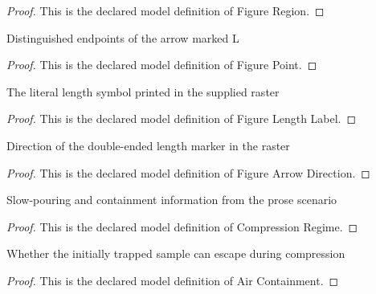 \begin{proof}
  This is the declared model definition of Figure Region.
\end{proof}
\begin{definition}
  \label{def:physics:phyx-mini-0366:phyxminiproblems-problemphyxmini0366-figurepoint}
  Distinguished endpoints of the arrow marked L
\end{definition}
\begin{proof}
  This is the declared model definition of Figure Point.
\end{proof}
\begin{definition}
  \label{def:physics:phyx-mini-0366:phyxminiproblems-problemphyxmini0366-figurelengthlabel}
  The literal length symbol printed in the supplied raster
\end{definition}
\begin{proof}
  This is the declared model definition of Figure Length Label.
\end{proof}
\begin{definition}
  \label{def:physics:phyx-mini-0366:phyxminiproblems-problemphyxmini0366-figurearrowdirection}
  Direction of the double-ended length marker in the raster
\end{definition}
\begin{proof}
  This is the declared model definition of Figure Arrow Direction.
\end{proof}
\begin{definition}
  \label{def:physics:phyx-mini-0366:phyxminiproblems-problemphyxmini0366-compressionregime}
  Slow-pouring and containment information from the prose scenario
\end{definition}
\begin{proof}
  This is the declared model definition of Compression Regime.
\end{proof}
\begin{definition}
  \label{def:physics:phyx-mini-0366:phyxminiproblems-problemphyxmini0366-aircontainment}
  Whether the initially trapped sample can escape during compression
\end{definition}
\begin{proof}
  This is the declared model definition of Air Containment.
\end{proof}
